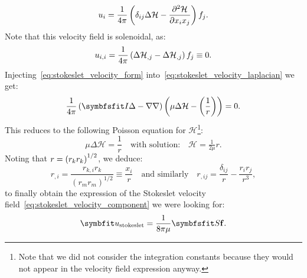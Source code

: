 \begin{equation}
 u_i=\frac{1}{4\pi}\left(\delta_{ij}\Delta \mathcal H-\frac{\partial ^2\mathcal H}{\partial x_ix_j}\right) f_j.
\label{eq:stokeslet_velocity_form}
\end{equation}
Note that this velocity field is solenoidal, as:
\begin{equation}
 u_{i,i}=\frac{1}{4\pi}\left(\Delta \mathcal H_{,j}-\Delta \mathcal H_{,j}\right) f_j \equiv 0.
\end{equation}
Injecting~\eqref{eq:stokeslet_velocity_form} into~\eqref{eq:stokeslet_velocity_laplacian} we get:
\begin{equation}
\frac{1}{4\pi}\lp\symbfsfit I\Delta-\nabla\nabla\rp\lp\mu\Delta\mathcal H-\lp\frac{1}{r}\rp\rp=0.
\end{equation}
This reduces to the following Poisson equation for $\mathcal H$\footnote{Note that we did not consider the integration constants because they would not appear in the velocity field expression anyway.}:
\begin{equation}
\mu\Delta\mathcal H=\frac{1}{r} \quad\text{with solution:}\quad\mathcal H=\tfrac{1}{2\mu}r.
\end{equation}
Noting that $r=\left( r_kr_k\right)^{1/2}$, we deduce:
\begin{equation}
r_{,i}=\frac{r_{k,i}r_k}{(r_mr_m)^{1/2}}\equiv\frac{x_i}{r} \quad \text{and similarly} \quad r_{,ij}=\frac{\delta_{ij}}{r}-\frac{r_ir_j}{r^3},
\end{equation}
to finally obtain the expression of the Stokeslet velocity field~\eqref{eq:stokeslet_velocity_component} we were looking for:
\begin{equation}
\bu_\text{stokeslet}=\frac{1}{8\pi\mu}\symbfsfit S \mathbf f.
\end{equation}
